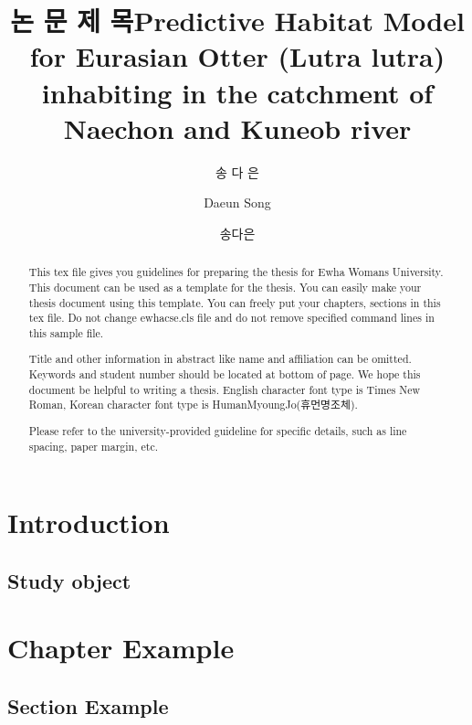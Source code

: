 \documentclass[doctor]{ewhacse}
\title[korean]{논 문 제 목}
\title[english]{Predictive Habitat Model for Eurasian Otter (Lutra lutra) inhabiting in the catchment of Naechon and Kuneob river}
\author[korean]{송 다 은}
\author[english]{Daeun Song}
\author[nospace]{송다은}
\begin{document}
\renewcommand{\baselinestretch}{1.8}    %
\fontsize {10.5pt}{10.5pt}
\selectfont 

\makelists   %

\begin{abstract}
\par %
This tex file gives you guidelines for preparing the thesis for Ewha Womans University. 
This document can be used as a template for the thesis. 
You can easily make your thesis document using this template. You can freely put your chapters,
sections in this tex file.
Do not change ewhacse.cls file and do not remove specified
command lines in this sample file.

Title and other information in abstract like name and affiliation can be
omitted. Keywords and student number should be located at bottom of
page. We hope this document be helpful to writing a thesis. English character font type is	Times New Roman, Korean character font type is HumanMyoungJo(휴먼명조체).

Please refer to the university-provided guideline for specific details, such as line spacing, paper margin, etc. 
	
\end{abstract}

%
\chapter{Introduction}
\par %

\section{Study object}
\lipsum[1]

\chapter{Chapter Example}

\section{Section Example}
\par %
\end{document}
